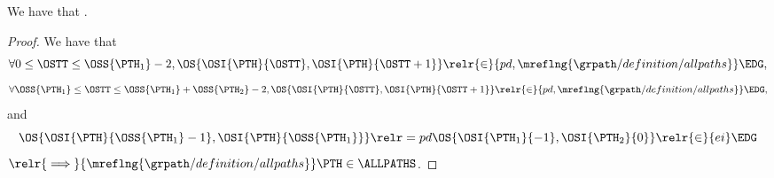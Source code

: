 \begin{proposition}
  We have that \subpathcombprop.%
\end{proposition}

\begin{proof}
  We have that 
  $$\forall 0 \le \OSTT \le \OSS{\PTH_1} - 2, \OS{\OSI{\PTH}{\OSTT}, \OSI{\PTH}{\OSTT+1}}
  \relr {\in} {pd,\mreflng{\grpath/definition/allpaths}} \EDG,$$
  $$\forall \OSS{\PTH_1} \le \OSTT \le \OSS{\PTH_1} + \OSS{\PTH_2} - 2, \OS{\OSI{\PTH}{\OSTT}, \OSI{\PTH}{\OSTT+1}}
  \relr {\in} {pd,\mreflng{\grpath/definition/allpaths}} \EDG,$$
  and
  $$\OS{\OSI{\PTH}{\OSS{\PTH_1} - 1}, \OSI{\PTH}{\OSS{\PTH_1}}} \relr = pd \OS{\OSI{\PTH_1}{-1}, \OSI{\PTH_2}{0}} \relr {\in} {ei} \EDG$$
  $\relr {\implies} {\mreflng{\grpath/definition/allpaths}} \PTH \in \ALLPATHS$.
\end{proof}
